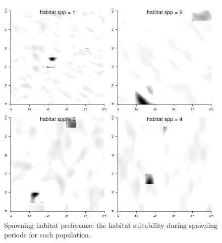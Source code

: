 \documentclass[review]{elsarticle}
\begin{document}
\begin{figure}[!ht]
	\includegraphics[width = \linewidth]{../analysis/habitat_spwn}
	\caption{Spawning habitat preference: the habitat suitability during
		spawning periods for each population.}
	\label{fig:2}
\end{figure}	
\end{document}
